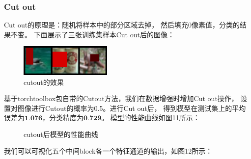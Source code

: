 \documentclass[UTF8]{ctexart}
\begin{document}
\subsubsection{Cut out}
Cut out的原理是：随机将样本中的部分区域去掉，
然后填充0像素值，分类的结果不变。
下面展示了三张训练集样本Cut out后的图像：

\begin{figure}[htbp]
    \centering
    \includegraphics[width=0.40\textwidth]{../img/sample_cutout.png}
    \caption{cutout的效果}
\end{figure}

基于torchtoolbox包自带的Cutout方法，我们在数据增强时增加Cut out操作，
设置对图像进行Cutout的概率为0.5。进行Cut out后，
得到模型在测试集上的平均误差为$\textbf{1.076}$，分类精度为$\textbf{0.729}$。
模型的性能曲线如图11所示：

\begin{figure}[htbp]
    \centering
    \hspace{0.5in}
    \caption{cutout后模型的性能曲线}
\end{figure}

我们可以可视化五个中间block各一个特征通道的输出，如图12所示：
\end{document}
